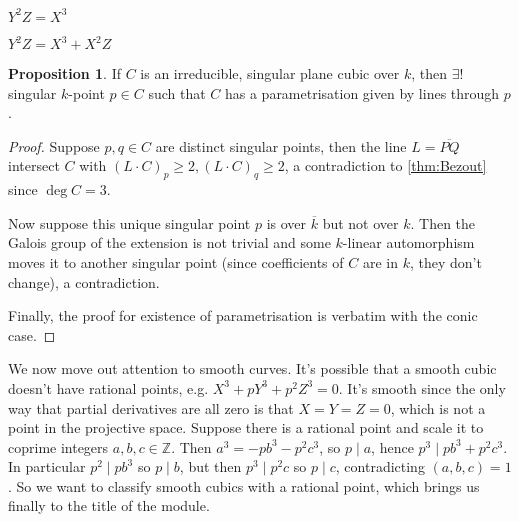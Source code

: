 \documentclass{article}
\newcommand{\Z}{\mathbb{Z}}
\theoremstyle{definition}
\newtheorem{prop}[defn]{Proposition}
\begin{document}
\begin{center}
\begin{minipage}{0.4\textwidth}
\begin{center}

$Y^2Z=X^3$
\end{center}
\end{minipage}
\begin{minipage}{0.4\textwidth}
\begin{center}

$Y^2Z=X^3+X^2Z$
\end{center}
\end{minipage}
\end{center}

\begin{prop}
If $C$ is an irreducible, singular plane cubic over $k$, then $\exists!$ singular $k$-point $p\in C$ such that $C$ has a parametrisation given by lines through $p$.
\end{prop}
\begin{proof}
Suppose $p,q\in C$ are distinct singular points, then the line $L=\overline{PQ}$ intersect $C$ with $(L\cdot C)_p\geq 2,(L\cdot C)_q\geq 2$, a contradiction to \ref{thm:Bezout} since $\deg C=3$.

Now suppose this unique singular point $p$ is over $\overline k$ but not over $k$. Then the Galois group of the extension is not trivial and some $k$-linear automorphism moves it to another singular point (since coefficients of $C$ are in $k$, they don't change), a contradiction.

Finally, the proof for existence of parametrisation is verbatim with the conic case.
\end{proof}

We now move out attention to smooth curves. It's possible that a smooth cubic doesn't have rational points, e.g. $X^3+pY^3+p^2Z^3=0$. It's smooth since the only way that partial derivatives are all zero is that $X=Y=Z=0$, which is not a point in the projective space. Suppose there is a rational point and scale it to coprime integers $a,b,c\in\Z$. Then $a^3=-pb^3-p^2c^3$, so $p\mid a$, hence $p^3\mid pb^3+p^2c^3$. In particular $p^2\mid pb^3$ so $p\mid b$, but then $p^3\mid p^2c$ so $p\mid c$, contradicting $(a,b,c)=1$. So we want to classify smooth cubics with a rational point, which brings us finally to the title of the module.
\end{document}
